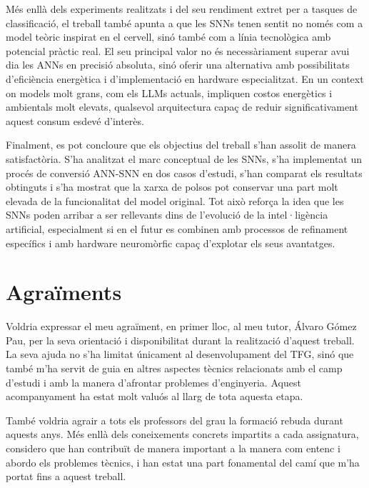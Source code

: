 \documentclass[a4paper,11pt, titlepage, twoside]{article}
\begin{document}
Més enllà dels experiments realitzats i del seu rendiment extret per a tasques de classificació, el treball també apunta a que les SNNs tenen sentit no només com a model teòric inspirat en el cervell, sinó també com a línia tecnològica amb potencial pràctic real. El seu principal valor no és necessàriament superar avui dia les ANNs en precisió absoluta, sinó oferir una alternativa amb possibilitats d’eficiència energètica i d’implementació en hardware especialitzat. En un context on models molt grans, com els LLMs actuals, impliquen costos energètics i ambientals molt elevats, qualsevol arquitectura capaç de reduir significativament aquest consum esdevé d’interès.

Finalment, es pot concloure que els objectius del treball s’han assolit de manera satisfactòria. S’ha analitzat el marc conceptual de les SNNs, s’ha implementat un procés de conversió ANN-SNN en dos casos d’estudi, s’han comparat els resultats obtinguts i s’ha mostrat que la xarxa de polsos pot conservar una part molt elevada de la funcionalitat del model original. Tot això reforça la idea que les SNNs poden arribar a ser rellevants dins de l’evolució de la intel·ligència artificial, especialment si en el futur es combinen amb processos de refinament específics i amb hardware neuromòrfic capaç d’explotar els seus avantatges.
\section*{Agraïments}

Voldria expressar el meu agraïment, en primer lloc, al meu tutor, Álvaro Gómez Pau, per la seva orientació i disponibilitat durant la realització d’aquest treball. La seva ajuda no s’ha limitat únicament al desenvolupament del TFG, sinó que també m’ha servit de guia en altres aspectes tècnics relacionats amb el camp d'estudi i amb la manera d’afrontar problemes d’enginyeria. Aquest acompanyament ha estat molt valuós al llarg de tota aquesta etapa.

També voldria agrair a tots els professors del grau la formació rebuda durant aquests anys. Més enllà dels coneixements concrets impartits a cada assignatura, considero que han contribuït de manera important a la manera com entenc i abordo els problemes tècnics, i han estat una part fonamental del camí que m’ha portat fins a aquest treball.
\end{document}
